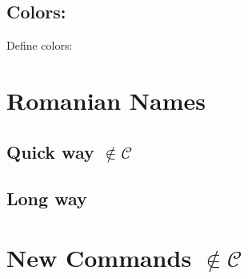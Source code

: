 \documentclass[11pt,a4paper]{article}
\newcommand{\noncurs}{\hspace{.5cm}$\notin \mathscr{C}$}
\begin{document}
{\subsection{Colors:}
\begin{latex}
\hypersetup{colorlinks=true, linkcolor=cyan, citecolor=green,
  filecolor=black, urlcolor=blue}
\end{latex}
Define colors:\\


\section{Romanian Names}
\subsection[Quick way]{Quick way \noncurs}

\code{\usepackage[romanian]{babel}}

\subsection{Long way}
\begin{latex}
\renewcommand{\contentsname}{Cuprins}
\renewcommand{\chaptername}{Capitolul}
\renewcommand{\bibname}{B\lowercase{ibliografie}}
\renewcommand{\appendixname}{Anexa}
\renewcommand{\indexname}{I\lowercase{ndice}}
\end{latex}

\section[New Commands]{New Commands \noncurs}
\begin{latex}

\newcommand{\lab}[1]{
  \section*{Laborator #1}
  \addcontentsline{toc}{section}{Laborator #1}
}

\usepackage{xparse}

\end{latex}

}
\end{document}
